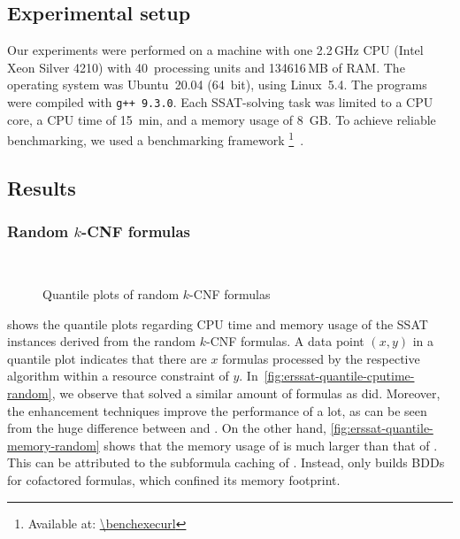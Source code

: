 \subsection{Experimental setup}
Our experiments were performed on a machine with
one 2.2\,GHz CPU (Intel Xeon Silver 4210) with 40~processing units and 134616\,MB of RAM.
The operating system was Ubuntu~20.04 (64~bit),
using Linux~5.4.
The programs were compiled with \texttt{g++ 9.3.0}.
Each SSAT-solving task was limited to a CPU core,
a CPU time of \SI{15}{min},
and a memory usage of \SI{8}{GB}.
To achieve reliable benchmarking,
we used a benchmarking framework \benchexec\footnote{Available at: \url{\benchexecurl}}~\cite{Benchmarking-STTT}.

\subsection{Results}

\subsubsection{Random $k$-CNF formulas}

\begin{figure*}[ht]
    \centering
    \\
    \caption{Quantile plots of random $k$-CNF formulas}
    \label{fig:erssat-quantile-random}
\end{figure*}

 shows the quantile plots regarding CPU time and memory usage
of the SSAT instances derived from the random $k$-CNF formulas.
A data point $(x,y)$ in a quantile plot indicates that
there are $x$ formulas processed by the respective algorithm within a resource constraint of $y$.
In~\cref{fig:erssat-quantile-cputime-random},
we observe that \erssat solved a similar amount of formulas as \dcssat did.
Moreover, the enhancement techniques improve the performance of \erssat a lot,
as can be seen from the huge difference between \erssat and \erssatb.
On the other hand,
\cref{fig:erssat-quantile-memory-random} shows that the memory usage of \dcssat is much larger than that of \erssat.
This can be attributed to the subformula caching of \dcssat.
Instead, \erssat only builds BDDs for cofactored formulas, which confined its memory footprint.

